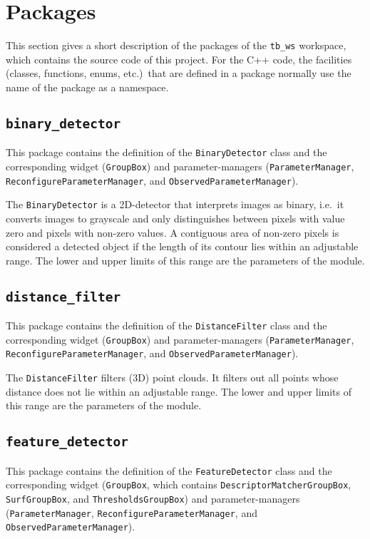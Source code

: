 \documentclass{article}
\newcommand{\code}[1]{\texttt{#1}}
\begin{document}
\section{Packages}

This section gives a short description of the packages of the \code{tb\_ws}
workspace, which contains the source code of this project.
For the C++ code, the facilities (classes, functions, enums, etc.)\
that are defined in a package normally use the name of the package as a namespace.

\subsection{\code{binary\_detector}}
This package contains the definition of the \code{BinaryDetector} class
and the corresponding widget (\code{GroupBox}) and parameter-managers
(\code{ParameterManager}, \code{ReconfigureParameterManager}, and
\code{ObservedParameterManager}).

The \code{BinaryDetector} is a 2D-detector that interprets images
as binary, i.e.\ it converts images to grayscale and only distinguishes between
pixels with value zero and pixels with non-zero values.
A contiguous area of non-zero pixels is considered a detected object
if the length of its contour lies within an adjustable range. The lower and
upper limits of this range are the parameters of the module.


\subsection{\code{distance\_filter}}
This package contains the definition of the \code{DistanceFilter} class
and the corresponding widget (\code{GroupBox}) and parameter-managers
(\code{ParameterManager}, \code{ReconfigureParameterManager}, and
\code{ObservedParameterManager}).

The \code{DistanceFilter} filters (3D) point clouds.
It filters out all points whose distance does not lie within an
adjustable range. The lower and upper limits of this range are
the parameters of the module.


\subsection{\code{feature\_detector}}
This package contains the definition of the \code{FeatureDetector} class
and the corresponding widget (\code{GroupBox}, which contains
\code{DescriptorMatcherGroupBox}, \code{SurfGroupBox}, and
\code{ThresholdsGroupBox}) and parameter-managers
(\code{ParameterManager}, \code{ReconfigureParameterManager}, and
\code{ObservedParameterManager}).
\end{document}
